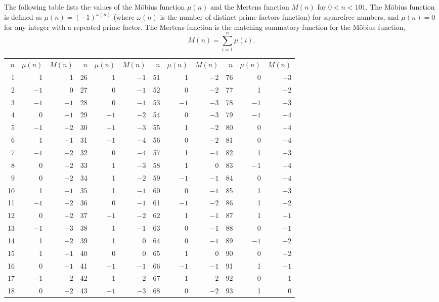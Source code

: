 \documentclass[12pt]{article}
\begin{document}
The following table lists the values of the M\"obius function $\mu(n)$ and the Mertens function $M(n)$ for $0 < n < 101$. The M\"obius function is defined as $\mu(n) = (-1)^{\omega(n)}$ (where $\omega(n)$ is the number of distinct prime factors function) for squarefree numbers, and $\mu(n) = 0$ for any integer with a repeated prime factor. The Mertens function is the matching summatory function for the M\"obius function, $$M(n) = \sum_{i = 1}^n \mu(i).$$

\begin{tabular}{|r|r|r|r|r|r|r|r|r|r|r|r|}
$n$ & $\mu(n)$ & $M(n)$ & $n$ & $\mu(n)$ & $M(n)$ & $n$ & $\mu(n)$ & $M(n)$ & $n$ & $\mu(n)$ & $M(n)$ \\
1 & 1 & 1 & 26 & 1 & $-1$ & 51 & 1 & $-2$ & 76 & 0 & $-3$ \\
2 & $-1$ & 0 & 27 & 0 & $-1$ & 52 & 0 & $-2$ & 77 & 1 & $-2$ \\
3 & $-1$ & $-1$ & 28 & 0 & $-1$ & 53 & $-1$ & $-3$ & 78 & $-1$ & $-3$ \\
4 & 0 & $-1$ & 29 & $-1$ & $-2$ & 54 & 0 & $-3$ & 79 & $-1$ & $-4$ \\
5 & $-1$ & $-2$ & 30 & $-1$ & $-3$ & 55 & 1 & $-2$ & 80 & 0 & $-4$ \\
6 & 1 & $-1$ & 31 & $-1$ & $-4$ & 56 & 0 & $-2$ & 81 & 0 & $-4$ \\
7 & $-1$ & $-2$ & 32 & 0 & $-4$ & 57 & 1 & $-1$ & 82 & 1 & $-3$ \\
8 & 0 & $-2$ & 33 & 1 & $-3$ & 58 & 1 & 0 & 83 & $-1$ & $-4$ \\
9 & 0 & $-2$ & 34 & 1 & $-2$ & 59 & $-1$ & $-1$ & 84 & 0 & $-4$ \\
10 & 1 & $-1$ & 35 & 1 & $-1$ & 60 & 0 & $-1$ & 85 & 1 & $-3$ \\
11 & $-1$ & $-2$ & 36 & 0 & $-1$ & 61 & $-1$ & $-2$ & 86 & 1 & $-2$ \\
12 & 0 & $-2$ & 37 & $-1$ & $-2$ & 62 & 1 & $-1$ & 87 & 1 & $-1$ \\
13 & $-1$ & $-3$ & 38 & 1 & $-1$ & 63 & 0 & $-1$ & 88 & 0 & $-1$ \\
14 & 1 & $-2$ & 39 & 1 & 0 & 64 & 0 & $-1$ & 89 & $-1$ & $-2$ \\
15 & 1 & $-1$ & 40 & 0 & 0 & 65 & 1 & 0 & 90 & 0 & $-2$ \\
16 & 0 & $-1$ & 41 & $-1$ & $-1$ & 66 & $-1$ & $-1$ & 91 & 1 & $-1$ \\
17 & $-1$ & $-2$ & 42 & $-1$ & $-2$ & 67 & $-1$ & $-2$ & 92 & 0 & $-1$ \\
18 & 0 & $-2$ & 43 & $-1$ & $-3$ & 68 & 0 & $-2$ & 93 & 1 & 0 \\

\end{tabular}
\end{document}
